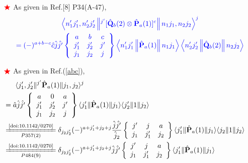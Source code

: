 \documentclass[master]{shnuthesis}
\newcommand{\il}{\!\!\!\!\!\!\!\!\!\!}
\newcommand{\zdydh}{\xlongequal}
\begin{document}
${\color{red} \bigstar}$ As given in Ref.[8] P34(A-47),
\begin{gather}
    {\color{blue}\left\langle n_{1}^{\prime} j_{1}^{\prime}, n_{2}^{\prime} j_{2}^{\prime} \left\|^{j^{\prime}} [\hat{\mathbf{Q}}_{b}(2) \otimes \hat{\mathbf{P}}_{a}(1)]^{c}\right\| n_{1} j_{1}, n_{2} j_{2} \right\rangle^j} \notag\\
    {\color{blue} =(-)^{a+b-c} \hat{c}\hat{j}\hat{j^\prime} 
        \left\{\begin{array}{ccc}
        a & b & c \\
        j_{1}^{\prime} & j_{2}^{\prime} & j^{\prime} \\
        j_{1} & j_{2} & j
        \end{array}\right\}
    \left\langle n_{1}^{\prime} j_{1}^{\prime}\left\|\hat{\mathbf{P}}_{a}(1)\right\| n_{1} j_{1}\right\rangle\left\langle n_{2}^{\prime} j_{2}^{\prime}\left\|\hat{\mathbf{Q}}_{b}(2)\right\| n_{2} j_{2}\right\rangle} \label{bac}
\end{gather}

${\color{red} \bigstar}$ As given in Ref.(\ref{abc}),
\begin{align}
    & \langle j_{1}^\prime, j_{2}^\prime\|^{j^{\prime}} \hat{\mathbf{P}}_{a}(1) \|j_{1}, j_{2} \rangle^{j}  \notag\\
    &\il = \hat{a}\hat{j}\hat{j^\prime}
        \left\{\begin{array}{ccc}
        a & 0 & a \\
        j_{1}^\prime & j_{2}^\prime & j^{\prime} \\
        j_{1} & j_{2} & j
        \end{array}\right\}
    \langle j_{1}^\prime\|\hat{\mathbf{P}}_{a}(1)\| j_{1}\rangle \langle j_{2}^\prime\| 1 \| j_{2}\rangle \\
    &\il \zdydh[P357(2)]{\text{\cite{doi:10.1142/0270}}} \delta_{j_2 j_2^\prime}(-)^{a+j_1^\prime+j_2+j} \frac{\hat{j}\hat{j^\prime}}{\hat{j}_2}
        \left\{\begin{array}{ccc}
        j^\prime & j & a \\
        j_{1} & j_{1}^\prime & j_2
        \end{array}\right\}
    \langle j_{1}^\prime\|\hat{\mathbf{P}}_{a}(1)\| j_{1}\rangle \langle j_{2}\| 1 \| j_{2}\rangle \\
    &\il \zdydh[P484(9)]{\text{\cite{doi:10.1142/0270}}} \delta_{j_2 j_2^\prime}(-)^{a+j_1^\prime+j_2+j} \hat{j}\hat{j^\prime}
        \left\{\begin{array}{ccc}
        j^\prime & j & a \\
        j_{1} & j_{1}^\prime & j_2
        \end{array}\right\}
    \langle j_{1}^\prime\|\hat{\mathbf{P}}_{a}(1)\| j_{1}\rangle \label{j1j2-1}
\end{align}
\end{document}
